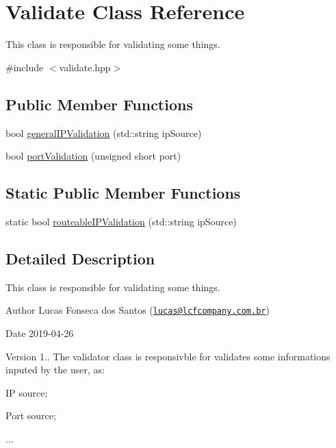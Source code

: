 \hypertarget{classValidate}{}\section{Validate Class Reference}
\label{classValidate}


This class is responsible for validating some things.  




{\ttfamily \#include $<$validate.\+hpp$>$}

\subsection*{Public Member Functions}
\begin{DoxyCompactItemize}
\item 
bool \mbox{\hyperlink{classValidate_a5fc61c0a14b82f79c5a3a9fb7c3616da}{general\+I\+P\+Validation}} (std\+::string ip\+Source)
\item 
bool \mbox{\hyperlink{classValidate_a6d52d9463a6d4542886c96f43db95faa}{port\+Validation}} (unsigned short port)
\end{DoxyCompactItemize}
\subsection*{Static Public Member Functions}
\begin{DoxyCompactItemize}
\item 
static bool \mbox{\hyperlink{classValidate_a7de09d185c262d596b9879727a4f298a}{routeable\+I\+P\+Validation}} (std\+::string ip\+Source)
\end{DoxyCompactItemize}


\subsection{Detailed Description}
This class is responsible for validating some things. 

\begin{DoxyAuthor}{Author}
Lucas Fonseca dos Santos (\href{mailto:lucas@lcfcompany.com.br}{\tt lucas@lcfcompany.\+com.\+br}) 
\end{DoxyAuthor}
\begin{DoxyDate}{Date}
2019-\/04-\/26 
\end{DoxyDate}
\begin{DoxyVersion}{Version}
1.. The validator class is responsivble for validates some informations inputed by the user, as\+:
\begin{DoxyItemize}
\item IP source;
\item Port source;
\item ... 
\end{DoxyItemize}
\end{DoxyVersion}



